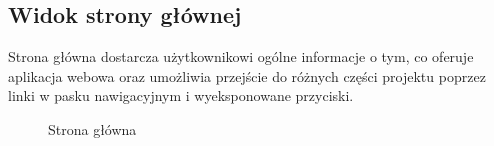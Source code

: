 \documentclass[shortabstract]{iithesis}
\begin{document}
\subsection{Widok strony głównej}
Strona główna dostarcza użytkownikowi ogólne informacje o tym, co oferuje aplikacja webowa oraz umożliwia przejście do różnych części projektu poprzez linki w pasku nawigacyjnym i wyeksponowane przyciski.

\begin{figure}[H]
    \centering
    \hfill
    \caption{Strona główna}
\end{figure}
\end{document}
